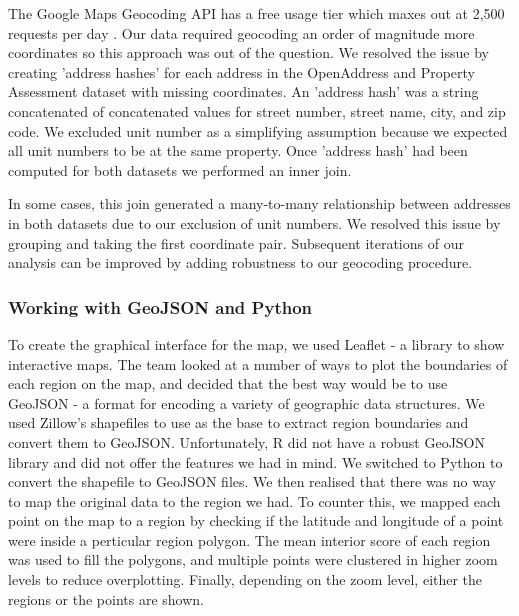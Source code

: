 \documentclass[12pt]{article}
\begin{document}
The Google Maps Geocoding API has a free usage tier which maxes out at
2,500 requests per day \cite{GettingS89:online}. Our data required
geocoding an order of magnitude more coordinates so this approach was
out of the question. We resolved the issue by creating 'address hashes'
for each address in the OpenAddress and Property Assessment dataset
with missing coordinates. An 'address hash' was a string concatenated
of concatenated values for street number, street name, city, and zip
code. We excluded unit number as a simplifying assumption because we
expected all unit numbers to be at the same property. Once 'address
hash' had been computed for both datasets we performed an inner join.

In some cases, this join generated a many-to-many relationship between
addresses in both datasets due to our exclusion of unit numbers. We
resolved this issue by grouping and taking the first coordinate pair.
Subsequent iterations of our analysis can be improved by adding
robustness to our geocoding procedure.

\subsubsection{Working with GeoJSON and Python}
To create the graphical interface for the map, we used Leaflet - a
library to show interactive maps. The team looked at a number of ways 
to plot the boundaries of each region on the map, and decided that 
the best way would be to use GeoJSON - a format for encoding a variety 
of geographic data structures. We used Zillow's shapefiles to use as 
the base to extract region boundaries and convert them to GeoJSON. 
Unfortunately, R did not have a robust GeoJSON library and did not 
offer the features we had in mind. We switched to Python to convert 
the shapefile to GeoJSON files. We then realised that there 
was no way to map the original data to the region we had. To counter this, 
we mapped each point on the map to a region by checking if the latitude 
and longitude of a point were inside a perticular region polygon. The mean 
interior score of each region was used to fill the polygons, and multiple 
points were clustered in higher zoom levels to reduce overplotting. 
Finally, depending on the zoom level, either the regions or the points are
shown.
\end{document}
